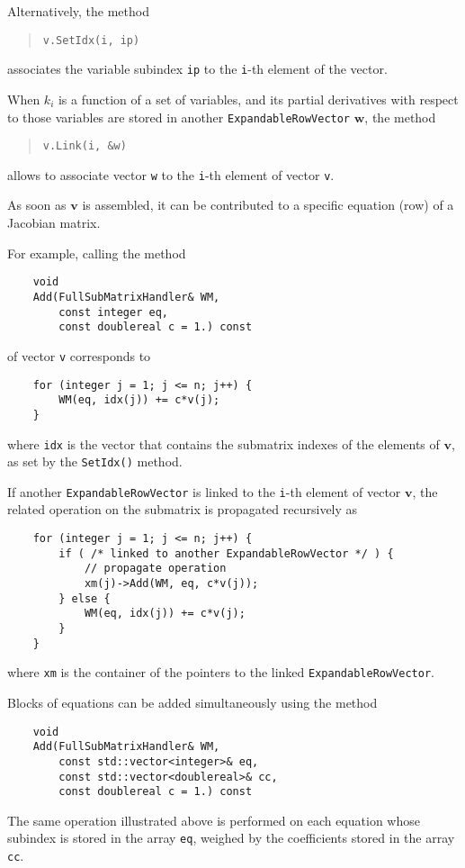 \documentclass[10pt,dvips,fleqn,subeqn]{report}
\newcommand{\T}[1]{\bm{#1}}
\begin{document}
Alternatively, the method
\begin{quote}
\texttt{v.SetIdx(i, ip)}
\end{quote}
associates the variable subindex \texttt{ip}
to the \texttt{i}-th element of the vector.

When $k_i$ is a function of a set of variables,
and its partial derivatives with respect to those variables
are stored in another \texttt{ExpandableRowVector} $\T{w}$,
the method
\begin{quote}
\texttt{v.Link(i, \&w)}
\end{quote}
allows to associate vector \texttt{w} to the \texttt{i}-th element
of vector \texttt{v}.

As soon as $\T{v}$ is assembled, it can be contributed
to a specific equation (row) of a Jacobian matrix.

For example, calling the method
\begin{verbatim}
    void
    Add(FullSubMatrixHandler& WM,
        const integer eq,
        const doublereal c = 1.) const
\end{verbatim}
of vector \texttt{v} corresponds to
\begin{verbatim}
    for (integer j = 1; j <= n; j++) {
        WM(eq, idx(j)) += c*v(j);
    }
\end{verbatim}
where \texttt{idx} is the vector that contains the submatrix indexes
of the elements of $\T{v}$, as set by the \texttt{SetIdx()} method.

If another \texttt{ExpandableRowVector} is linked
to the \texttt{i}-th element of vector $\T{v}$,
the related operation on the submatrix is propagated recursively as
\begin{verbatim}
    for (integer j = 1; j <= n; j++) {
        if ( /* linked to another ExpandableRowVector */ ) {
            // propagate operation
            xm(j)->Add(WM, eq, c*v(j));
        } else {
            WM(eq, idx(j)) += c*v(j);
        }
    }
\end{verbatim}
where \texttt{xm} is the container of the pointers to the linked
\texttt{ExpandableRowVector}.

Blocks of equations can be added simultaneously using the method
\begin{verbatim}
    void
    Add(FullSubMatrixHandler& WM,
        const std::vector<integer>& eq,
        const std::vector<doublereal>& cc,
        const doublereal c = 1.) const
\end{verbatim}
The same operation illustrated above is performed on each equation
whose subindex is stored in the array \texttt{eq}, weighed by the
coefficients stored in the array \texttt{cc}.
\end{document}
